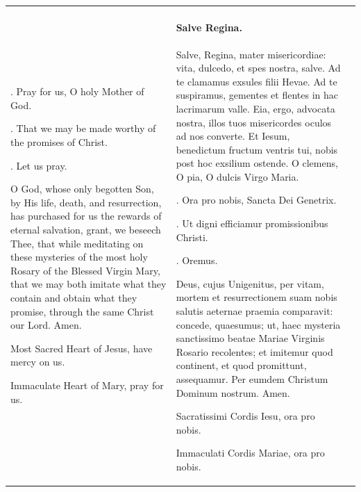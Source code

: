 \documentclass{article}
\makeatletter
\DeclareRobustCommand{\versicle}{\textbf{\vers@resp{-0.1em}{V}}}
\DeclareRobustCommand{\response}{\textbf{\vers@resp{0pt}{R}}}
\newcommand{\vers@resp@sym}{\raisebox{0.2ex}{\rotatebox[origin=c]{-20}{$\m@th\rceil$}}}
\newcommand{\vers@resp}[2]{%
  {\ooalign{\hidewidth\kern#1\vers@resp@sym\hidewidth\cr#2\cr}}%
}
\makeatother
\begin{document}
\begin{tabularx}{\textwidth}{ |X|X| }
\versicle. Pray for us, O holy Mother of God.

\response. That we may be made worthy of the promises of Christ.

\versicle. Let us pray.

O God, whose only begotten Son, by His life, death, and resurrection,
has purchased for us the rewards of eternal salvation,
grant, we beseech Thee, that while meditating on these mysteries of the most
holy Rosary of the Blessed Virgin Mary, that we may both imitate what they
contain and obtain what they promise, through the same Christ our Lord. Amen.

Most Sacred Heart of Jesus, have mercy on us.

Immaculate Heart of Mary, pray for us.
&
\paragraph{Salve Regina.} Salve, Regina, mater misericordiae: vita, dulcedo, et spes nostra, salve. Ad te clamamus exsules filii Hevae. Ad te suspiramus, gementes et flentes in hac lacrimarum valle. Eia, ergo, advocata nostra, illos tuos misericordes oculos ad nos converte. Et Iesum, benedictum fructum ventris tui, nobis post hoc exsilium ostende. O clemens, O pia, O dulcis Virgo Maria.

\versicle. Ora pro nobis, Sancta Dei Genetrix.

\response. Ut digni efficiamur promissionibus Christi.

\versicle. Oremus.

Deus, cujus Unigenitus, per vitam, mortem et resurrectionem suam nobis salutis aeternae praemia comparavit: concede, quaesumus; ut, haec mysteria sanctissimo beatae Mariae Virginis Rosario recolentes; et imitemur quod continent, et quod promittunt, assequamur. Per eumdem Christum Dominum nostrum. Amen.

Sacratissimi Cordis Iesu, ora pro nobis.

Immaculati Cordis Mariae, ora pro nobis.


&
\hline
\end{tabularx}

\pagebreak
\end{document}
